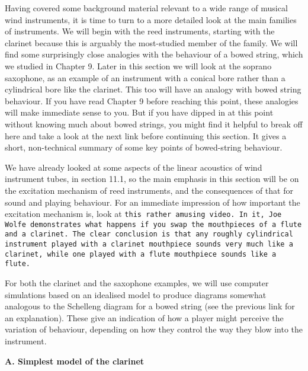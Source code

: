 

  Having covered some background material relevant to a wide range of musical 
  wind instruments, it is time to turn to a more detailed look at the main 
  families of instruments. We will begin with the reed instruments, starting 
  with the clarinet because this is arguably the most-studied member of the 
  family. We will find some surprisingly close analogies with the behaviour of 
  a bowed string, which we studied in Chapter 9. Later in this section we will 
  look at the soprano saxophone, as an example of an instrument with a conical 
  bore rather than a cylindrical bore like the clarinet. This too will have an 
  analogy with bowed string behaviour. If you have read Chapter 9 before 
  reaching this point, these analogies will make immediate sense to you. But if 
  you have dipped in at this point without knowing much about bowed strings, 
  you might find it helpful to break off here and take a look at the next link 
  before continuing this section. It gives a short, non-technical summary of 
  some key points of bowed-string behaviour. 

  We have already looked at some aspects of the linear acoustics of wind 
  instrument tubes, in section 11.1, so the main emphasis in this section will 
  be on the excitation mechanism of reed instruments, and the consequences of 
  that for sound and playing behaviour. For an immediate impression of how 
  important the excitation mechanism is, look at \tt{}this rather amusing 
  video\rm{}. In it, Joe Wolfe demonstrates what happens if you swap the 
  mouthpieces of a flute and a clarinet. The clear conclusion is that any 
  roughly cylindrical instrument played with a clarinet mouthpiece sounds very 
  much like a clarinet, while one played with a flute mouthpiece sounds like a 
  flute. 

  For both the clarinet and the saxophone examples, we will use computer 
  simulations based on an idealised model to produce diagrams somewhat 
  analogous to the Schelleng diagram for a bowed string (see the previous link 
  for an explanation). These give an indication of how a player might perceive 
  the variation of behaviour, depending on how they control the way they blow 
  into the instrument. 

  \textbf{A. Simplest model of the clarinet} 

